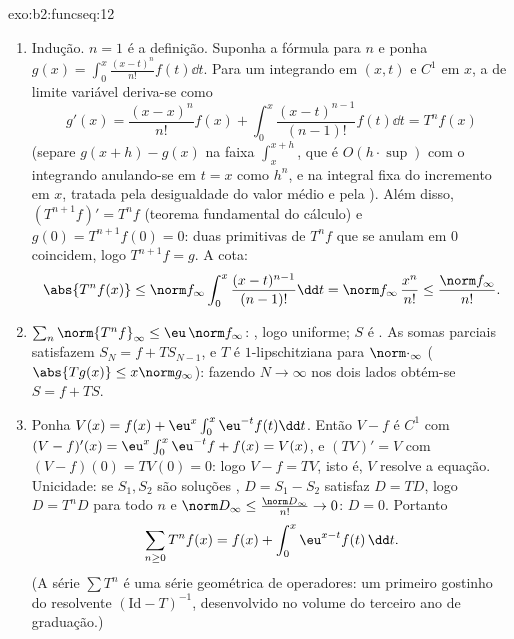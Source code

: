\begin{solution}{exo:b2:funcseq:12}
\begin{enumerate}
  \item Indução. $n = 1$ é a definição. Suponha a fórmula
        para $n$ e ponha $g(x) = \int_0^x \frac{(x-t)^n}{n!}
        f(t)\dd t$. Para um integrando  em $(x,t)$ e
        $C^1$ em $x$, a  de limite variável
        deriva-se como
        \[
        g'(x) = \frac{(x-x)^n}{n!}f(x)
        + \int_0^x \frac{(x-t)^{n-1}}{(n-1)!}f(t)\dd t
        = T^nf(x)
        \]
        (separe $g(x+h) - g(x)$ na faixa
        $\int_x^{x+h}$, que é $O(h\cdot\sup)$ com o
        integrando anulando-se em $t = x$ como $h^n$, e na
        integral fixa do incremento em $x$, tratada pela desigualdade do valor
        médio e pela ). Além disso, $(T^{n+1}f)' = T^nf$
        (teorema fundamental do cálculo) e $g(0) =
        T^{n+1}f(0) = 0$: duas primitivas de $T^nf$ que se anulam em
        $0$ coincidem, logo $T^{n+1}f = g$. A cota:
        \[
        \abs{T^nf(x)} \leq \norm f_\infty
        \int_0^x \frac{(x-t)^{n-1}}{(n-1)!}\dd t
        = \norm f_\infty\,\frac{x^n}{n!}
        \leq \frac{\norm f_\infty}{n!} .
        \]
  \item $\sum_n \norm{T^nf}_\infty \leq \eu\,\norm f_\infty$:
        , logo uniforme; $S$ é .
        As somas parciais satisfazem $S_N = f + T S_{N-1}$, e $T$
        é $1$-lipschitziana para $\norm\cdot_\infty$
        ($\abs{Tg(x)} \leq x\norm g_\infty$): fazendo $N \to
        \infty$ nos dois lados obtém-se $S = f + TS$.
  \item Ponha $V(x) = f(x) + \eu^x\int_0^x \eu^{-t}f(t)\dd t$.
        Então $V - f$ é $C^1$ com $(V-f)'(x) =
        \eu^x\int_0^x\eu^{-t}f + f(x) = V(x)$, e $(TV)' = V$
        com $(V - f)(0) = TV(0) = 0$: logo $V - f = TV$, isto é,
        $V$ resolve a equação. Unicidade: se $S_1, S_2$ são
        soluções , $D = S_1 - S_2$ satisfaz $D =
        TD$, logo $D = T^nD$ para todo $n$ e $\norm D_\infty
        \leq \frac{\norm D_\infty}{n!} \to 0$: $D = 0$.
        Portanto
        \[
        \sum_{n\geq0} T^nf(x) = f(x) +
        \int_0^x \eu^{x-t}f(t)\,\dd t .
        \]
        (A série $\sum T^n$ é uma série geométrica de
        operadores: um primeiro gostinho do resolvente
        $(\mathrm{Id} - T)^{-1}$, desenvolvido no volume do terceiro ano
        de graduação.)
\end{enumerate}
\end{solution}

